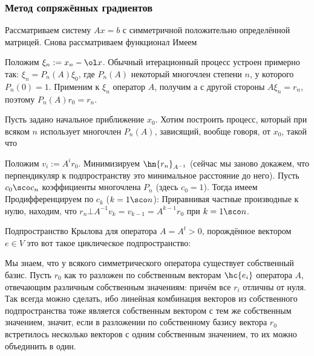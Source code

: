 \documentclass[a4paper]{article}
\begin{document}
\subsubsection{Метод сопряжённых градиентов}

Рассматриваем систему $Ax = b$ с симметричной положительно
определённой матрицей.  Снова рассматриваем функционал   Имеем 

Положим $\xi_n := x_n - \ol x$. Обычный итерационный процесс устроен
примерно так: $\xi_n = P_n(A)\xi_0$, где $P_n(A)$ некоторый многочлен
степени $n$, у которого $P_n(0) = 1$.  Применим к $\xi_n$ оператор
$A$, получим  а с другой стороны $A\xi_n = r_n$, поэтому $P_n(A) r_0 =
r_n$.

Пусть задано начальное приближение $x_0$. Хотим построить процесс,
который при всяком $n$ использует многочлен $P_n(A)$, зависящий,
вообще говоря, от $x_0$, такой что 

Положим $v_i := A^i r_0$.  Минимизируем $\hn{r_n}_{A^{-1}}$ (сейчас мы
заново докажем, что перпендикуляр к подпространству это минимальное
расстояние до него).  Пусть $c_0\sco c_n$ коэффициенты многочлена
$P_n$ (здесь $c_0 = 1$).  Тогда имеем   Продифференцируем по $c_k$ ($k = 1\sco n$):   Приравнивая частные
производные к нулю, находим, что $r_n \bot A^{-1} v_k = v_{k-1} =
A^{k-1} r_0$ при $k = 1\sco n$.

\begin{df}
Подпространство Крылова для оператора $A = A^t > 0$, порождённое
вектором $e \in V$ это вот такое циклическое подпространство:
\end{df}

Мы знаем, что у всякого симметрического оператора существует
собственный базис.  Пусть $r_0$ как то разложен по собственным
векторам $\hc{e_i}$ оператора $A$, отвечающим различным собственным
значениям:  причём все $r_i$
отличны от нуля. Так всегда можно сделать, ибо линейная комбинация
векторов из собственного подпространства тоже является собственным
вектором с тем же собственным значением, значит, если в разложении по
собственному базису вектора $r_0$ встретилось несколько векторов с
одним собственным значением, то их можно объединить в один.
\end{document}
